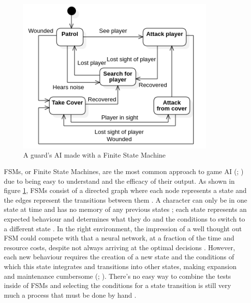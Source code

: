 \documentclass[11pt, a4paper]{report}
\begin{document}
\begin{figure}[!h]
  \centering
  \includegraphics[width=10cm]{img/finite_state_machine.png}
  \caption{A guard's AI made with a Finite State Machine}
  \label{fig:finiteStateMachines}
\end{figure}

FSMs, or Finite State Machines, are the most common approach to game AI (\cite[1]{orkin2006three}; \cite[309]{millington2019ai}) due to being easy to understand and the efficacy of their output. As shown in figure \ref{fig:finiteStateMachines}, FSMs consist of a directed graph where each node represents a state and the edges represent the transitions between them \parencite[6]{tozour2002evolution}. A character can only be in one state at time and has no memory of any previous states \parencite{colledanchise2014performance}; each state represents an expected behaviour and determines what they do and the conditions to switch to a different state \parencite[3]{diller2004behavior}. In the right environment, the impression of a well thought out FSM could compete with that a neural network, at a fraction of the time and resource costs, despite not always arriving at the optimal decisions \parencite{sweetser2002current}. However, each new behaviour requires the creation of a new state and the conditions of which this state integrates and transitions into other states, making expansion and maintenance cumbersome (\cite[2]{sweetser2002current}; \cite[3]{lim2010evolving}). There's no easy way to combine the tests inside of FSMs and selecting the conditions for a state transition is still very much a process that must be done by hand \parencite[313]{millington2019ai}. 
\end{document}
